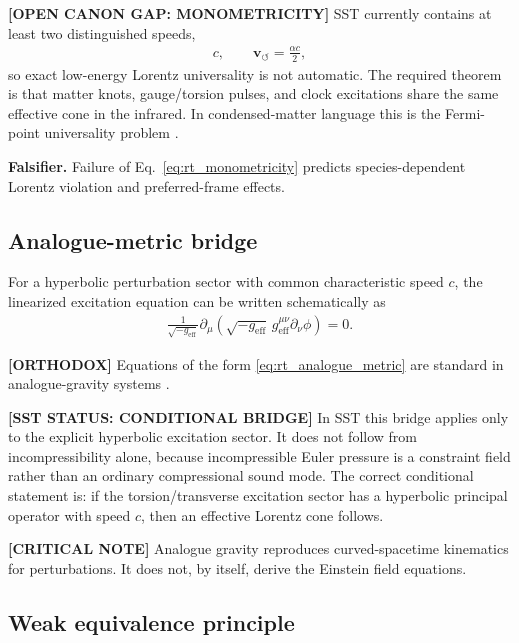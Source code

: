 \textbf{[OPEN CANON GAP: MONOMETRICITY]} SST currently contains at least two
distinguished speeds,
\begin{align}
    c,
    \qquad
    \mathbf{v}_{\!\boldsymbol{\circlearrowleft}}
    =
    \frac{\alpha c}{2},
\end{align}
so exact low-energy Lorentz universality is not automatic. The required theorem
is that matter knots, gauge/torsion pulses, and clock excitations share the
same effective cone in the infrared. In condensed-matter language this is the
Fermi-point universality problem \cite{Volovik2003}.

\textbf{Falsifier.} Failure of Eq.~\eqref{eq:rt_monometricity} predicts
species-dependent Lorentz violation and preferred-frame effects.

\subsection{Analogue-metric bridge}

For a hyperbolic perturbation sector with common characteristic speed \(c\),
the linearized excitation equation can be written schematically as
\begin{align}
    \frac{1}{\sqrt{-g_{\mathrm{eff}}}}
    \partial_\mu
    \left(
        \sqrt{-g_{\mathrm{eff}}}\,
        g_{\mathrm{eff}}^{\mu\nu}
        \partial_\nu \phi
    \right)
    =
    0 .
    \label{eq:rt_analogue_metric}
\end{align}

\textbf{[ORTHODOX]} Equations of the form
\eqref{eq:rt_analogue_metric} are standard in analogue-gravity systems
\cite{Unruh1981,BarceloLiberatiVisser2011}.

\textbf{[SST STATUS: CONDITIONAL BRIDGE]} In SST this bridge applies only to the
explicit hyperbolic excitation sector. It does not follow from incompressibility
alone, because incompressible Euler pressure is a constraint field rather than
an ordinary compressional sound mode. The correct conditional statement is: if
the torsion/transverse excitation sector has a hyperbolic principal operator
with speed \(c\), then an effective Lorentz cone follows.

\textbf{[CRITICAL NOTE]} Analogue gravity reproduces curved-spacetime
kinematics for perturbations. It does not, by itself, derive the Einstein field
equations.

\subsection{Weak equivalence principle}

